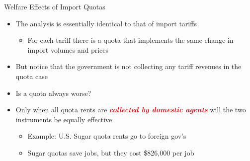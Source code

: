 \documentclass[10pt,hyperref={CJKbookmarks=true},xcolor=dvipsnames,aspectratio=169]{beamer}
\begin{document}
\begin{frame}{Welfare Effects of Import Quotas}

\begin{itemize}
\item The analysis is essentially identical to that of import tariffs 

\begin{itemize}
\item For each tariff there is a quota that implements the same change in
import volumes and prices 
\end{itemize}
\item But notice that the government is not collecting any tariff revenues
in the quota case 
\item Is a quota always worse? 
\item Only when all quota rents are \textbf{\textcolor{red}{\emph{collected
by domestic agents}}} will the two instruments be equally effective 

\begin{itemize}
\item Example: U.S. Sugar quota rents go to foreign gov’s 
\item Sugar quotas save jobs, but they cost \$826,000 per job
\end{itemize}
\end{itemize}
\end{frame}

\end{document}
